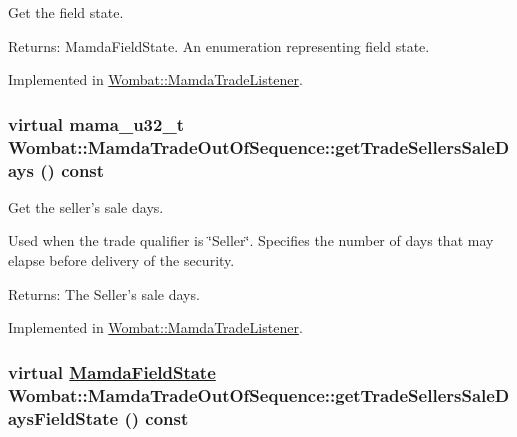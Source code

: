 Get the field state. 

\begin{Desc}
\item[Returns:]Mamda\-Field\-State. An enumeration representing field state. \end{Desc}


Implemented in \hyperlink{classWombat_1_1MamdaTradeListener_2e60dd06819139125a4812e84d5803c0}{Wombat::Mamda\-Trade\-Listener}.\hypertarget{classWombat_1_1MamdaTradeOutOfSequence_c397454fff2397f0da68132f3eaec372}{
\subsubsection[getTradeSellersSaleDays]{\setlength{\rightskip}{0pt plus 5cm}virtual mama\_\-u32\_\-t Wombat::Mamda\-Trade\-Out\-Of\-Sequence::get\-Trade\-Sellers\-Sale\-Days () const}}
\label{classWombat_1_1MamdaTradeOutOfSequence_c397454fff2397f0da68132f3eaec372}


Get the seller's sale days. 

Used when the trade qualifier is \char`\"{}Seller\char`\"{}. Specifies the number of days that may elapse before delivery of the security.

\begin{Desc}
\item[Returns:]The Seller's sale days. \end{Desc}


Implemented in \hyperlink{classWombat_1_1MamdaTradeListener_719ed8fafd8f299b274ba2f11981b3ba}{Wombat::Mamda\-Trade\-Listener}.\hypertarget{classWombat_1_1MamdaTradeOutOfSequence_1a060e2fe8efbc8fda0994cb8ea3d707}{
\subsubsection[getTradeSellersSaleDaysFieldState]{\setlength{\rightskip}{0pt plus 5cm}virtual \hyperlink{namespaceWombat_93aac974f2ab713554fd12a1fa3b7d2a}{Mamda\-Field\-State} Wombat::Mamda\-Trade\-Out\-Of\-Sequence::get\-Trade\-Sellers\-Sale\-Days\-Field\-State () const}}
\label{classWombat_1_1MamdaTradeOutOfSequence_1a060e2fe8efbc8fda0994cb8ea3d707}


